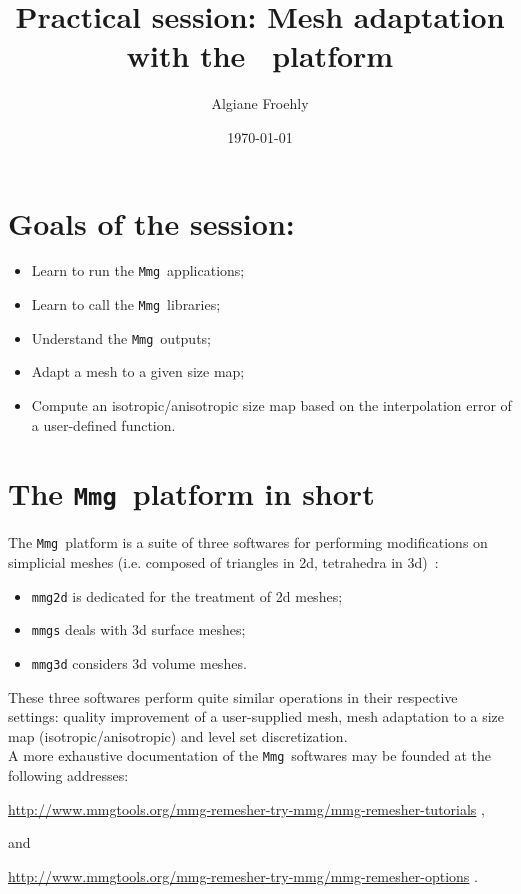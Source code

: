 \documentclass{article}
\author{Algiane Froehly}
\date{\today}
\title{Practical session: Mesh adaptation with the \mmg\ platform}
\newcommand{\mmg}{\texttt{Mmg}}
\begin{document}
\maketitle

\date{}

\section{Goals of the session:}
\begin{itemize}
\item Learn to run the \mmg\ applications;
\item Learn to call the \mmg\ libraries;
\item Understand the \mmg\ outputs;
\item Adapt a mesh to a given size map;
\item Compute an isotropic/anisotropic size map based on the interpolation error of a user-defined function.
\end{itemize}

\section{The \mmg\ platform in short}

The \mmg\ platform is a suite of three softwares for performing modifications on simplicial meshes (i.e. composed of triangles in 2d, tetrahedra in 3d)~:
\begin{itemize}
\item \texttt{mmg2d} is dedicated for the treatment of 2d meshes;
\item \texttt{mmgs} deals with 3d surface meshes;
\item \texttt{mmg3d} considers 3d volume meshes.
\end{itemize}
These three softwares perform quite similar operations in their respective settings:  
quality improvement of a user-supplied mesh, mesh adaptation to a size
map (isotropic/anisotropic) and level set discretization.\\

A more exhaustive documentation of the \mmg\ softwares may be founded at the following addresses:
\begin{center}
\url{http://www.mmgtools.org/mmg-remesher-try-mmg/mmg-remesher-tutorials} ,  
\end{center}
and 
\begin{center}
\url{http://www.mmgtools.org/mmg-remesher-try-mmg/mmg-remesher-options} . 
\end{center}
\end{document}

